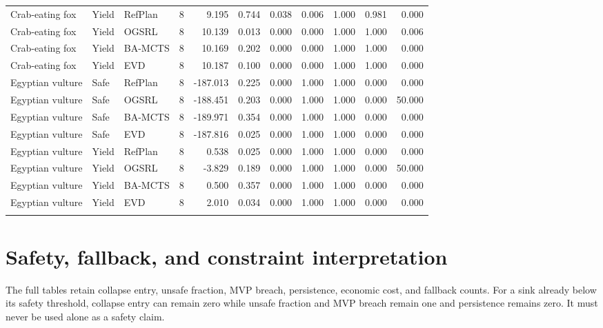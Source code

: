 \documentclass[10pt]{article}
\begin{document}
\begin{landscape}
\begin{center}
\begin{longtable}{@{}lllrrrrrrrr@{}}
\addlinespace[1.5pt]
Crab-eating fox & Yield & RefPlan & 8 & 9.195 & 0.744 & 0.038 & 0.006 & 1.000 & 0.981 & 0.000 \\
Crab-eating fox & Yield & OGSRL & 8 & 10.139 & 0.013 & 0.000 & 0.000 & 1.000 & 1.000 & 0.006 \\
Crab-eating fox & Yield & BA-MCTS & 8 & 10.169 & 0.202 & 0.000 & 0.000 & 1.000 & 1.000 & 0.000 \\
Crab-eating fox & Yield & EVD & 8 & 10.187 & 0.100 & 0.000 & 0.000 & 1.000 & 1.000 & 0.000 \\
\addlinespace[1.5pt]
Egyptian vulture & Safe & RefPlan & 8 & -187.013 & 0.225 & 0.000 & 1.000 & 1.000 & 0.000 & 0.000 \\
Egyptian vulture & Safe & OGSRL & 8 & -188.451 & 0.203 & 0.000 & 1.000 & 1.000 & 0.000 & 50.000 \\
Egyptian vulture & Safe & BA-MCTS & 8 & -189.971 & 0.354 & 0.000 & 1.000 & 1.000 & 0.000 & 0.000 \\
Egyptian vulture & Safe & EVD & 8 & -187.816 & 0.025 & 0.000 & 1.000 & 1.000 & 0.000 & 0.000 \\
\addlinespace[1.5pt]
Egyptian vulture & Yield & RefPlan & 8 & 0.538 & 0.025 & 0.000 & 1.000 & 1.000 & 0.000 & 0.000 \\
Egyptian vulture & Yield & OGSRL & 8 & -3.829 & 0.189 & 0.000 & 1.000 & 1.000 & 0.000 & 50.000 \\
Egyptian vulture & Yield & BA-MCTS & 8 & 0.500 & 0.357 & 0.000 & 1.000 & 1.000 & 0.000 & 0.000 \\
Egyptian vulture & Yield & EVD & 8 & 2.010 & 0.034 & 0.000 & 1.000 & 1.000 & 0.000 & 0.000 \\
\addlinespace[1.5pt]
\end{longtable}
\end{center}
\end{landscape}

\section{Safety, fallback, and constraint interpretation}
The full tables retain collapse entry, unsafe fraction, MVP breach, persistence, economic cost,
and fallback counts. For a sink already below its safety threshold, collapse entry can remain zero
while unsafe fraction and MVP breach remain one and persistence remains zero. It must never be used
alone as a safety claim.
\end{document}
